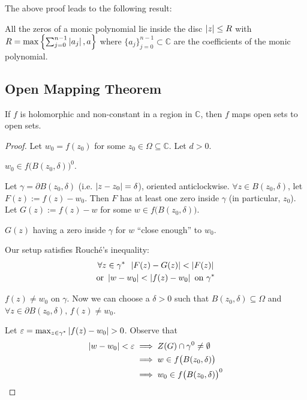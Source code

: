 \documentclass[11pt, oneside]{book}
\begin{document}
The above proof leads to the following result:

\begin{crly}\label{crly:rouche_fta_crly}
  All the zeros of a monic polynomial lie inside the disc $\left|z\right| \leq R$ with $R = \max\left\{ \sum_{j=0}^{n-1} \left|a_j\right| , a \right\}$ where $\{a_j\}_{j = 0}^{n - 1} \subset \mathbb{C}$ are the coefficients of the monic polynomial.
\end{crly}


\subsection{Open Mapping Theorem} %
\label{sub:open_mapping_theorem}

\begin{thm}\label{thm:open_mapping_theorem}
  If $f$ is holomorphic and non-constant in a region in $\mathbb{C}$, then $f$ maps open sets to open sets.
\end{thm}

\begin{proof}
  Let $w_0 = f(z_0)$ for some $z_0 \in \Omega \subseteq \mathbb{C}$. Let $d > 0$.

   $w_0 \in f\big(B(z_0, \delta) \big)^0$.

  Let $\gamma = \partial B(z_0, \delta)$ (i.e. $\left|z - z_0\right| = \delta$), oriented anticlockwise. $\forall z \in B(z_0, \delta)$, let $F(z) := f(z) - w_0$. Then $F$ has at least one zero inside $\gamma$ (in particular, $z_0$). Let $G(z) := f(z) - w$ for some $w \in f\big( B(z_0, \delta) \big)$.

   $G(z)$ having a zero inside $\gamma$ for $w$ ``close enough'' to $w_0$.

  Our setup satisfies Rouch\'e's inequality:
  \begin{gather*}
    \forall z \in \gamma^* \enspace \left|F(z) - G(z)\right| < \left|F(z)\right| \\
    \text{or } \left|w - w_0\right| < \left|f(z) - w_0\right| \text{ on } \gamma^*
  \end{gather*}

   $f(z) \neq w_0$ on $\gamma$. Now we can choose a $\delta > 0$ such that $B(z_0, \delta) \subseteq \Omega$ and $\forall z \in \partial B(z_0, \delta), \, f(z) \neq w_0$.

  Let $\varepsilon = \max_{z \in \gamma^*} \left|f(z) - w_0\right| > 0$. Observe that
  \begin{align*}
    \left|w - w_0\right| < \varepsilon
      &\implies Z(G) \cap \gamma^0 \neq \emptyset \\
      &\implies w \in f\big( B(z_0, \delta) \big) \\
      &\implies w_0 \in f\big( B(z_0, \delta) \big)^0
  \end{align*}
\end{proof}
\end{document}

